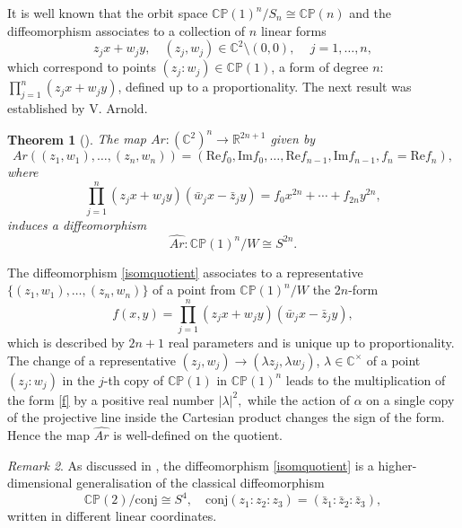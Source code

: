 \documentclass[11pt]{amsart}
\newtheorem{theorem}{Theorem}[section]
\theoremstyle{definition}
\theoremstyle{remark}
\newtheorem{remark}[theorem]{Remark}
\numberwithin{equation}{section}
\newcommand{\CP}{\mathbb{CP}}
\begin{document}
It is well known that the orbit space $\CP(1)^n/S_n \cong \CP(n)$ and the diffeomorphism associates to a collection of $n$ linear forms 
$$
z_j x + w_j y, \quad (z_j, w_j)\in \mathbb C^2\setminus (0,0),\quad  \, j = 1,\dots,n,
$$ 
which correspond to points $(z_j: w_j) \in \CP(1)$, a form of degree $n$: $\prod_{j=1}^n (z_j x + w_j y)$, defined up to a proportionality.  The next result was established by V. Arnold. 
%
\begin{theorem}[\cite{Arnold1996}]
\label{first}
The map
$
Ar\colon  
(\mathbb C^2)^n\to \mathbb{R}^{2n+1}
$
given by
\[
Ar\left((z_1,w_1),\dots,(z_n,w_n)\right) = (\mathrm{Re} f_{0}, \mathrm{Im} f_0,\dots, \mathrm{Re} f_{n-1}, \mathrm{Im} f_{n-1},f_n=\mathrm{Re}f_n),
\]
where
\begin{equation}
    \label{formexpanded}
\prod_{j=1}^n(z_j x +w_j y)(\bar{w}_j x - \bar{z}_jy) = f_0x^{2n} + \cdots + f_{2n}y^{2n},
\end{equation}
induces a diffeomorphism
\begin{equation}
\label{isomquotient}
\widehat{Ar}\colon \CP(1)^n/W \cong S^{2n}.
\end{equation}
\end{theorem}
The diffeomorphism \eqref{isomquotient} associates to a representative $\{(z_1,w_1),\dots, (z_n,w_n)\}$ of a point from $\CP(1)^n/W$ the $2n$-form  
\begin{equation}\label{f}%
    f(x,y) = \prod_{j=1}^n (z_jx+w_jy)(\bar{w}_j x-\bar{z}_jy),
\end{equation}
which is described by $2n+1$ real parameters and is unique up to proportionality. The change of a representative $(z_j,w_j) \to (\lambda z_j, \lambda w_j)$, $\lambda \in \mathbb C^\times$ of a point $(z_j: w_j)$ in the $j$-th copy of $\CP(1)$ in $\CP(1)^n$ leads to the multiplication of the form \eqref{f} by a positive real number $|\lambda|^2,$ while the action of $\alpha$ on a single copy of the projective line inside the Cartesian product changes the sign of the form. Hence the map $\widehat{Ar}$ is well-defined on the quotient. 

\begin{remark}
    As discussed in \cite{Arnold1996}, the diffeomorphism \eqref{isomquotient} is a higher-dimensional generalisation of the classical diffeomorphism
    \[
    \CP(2)/\mathrm{conj} \cong S^4, \quad \mathrm{conj}(z_1:z_2:z_3)=(\bar{z}_1: \bar{z}_2: \bar{z}_3),
    \]
    written in different linear coordinates.
\end{remark}
\end{document}

